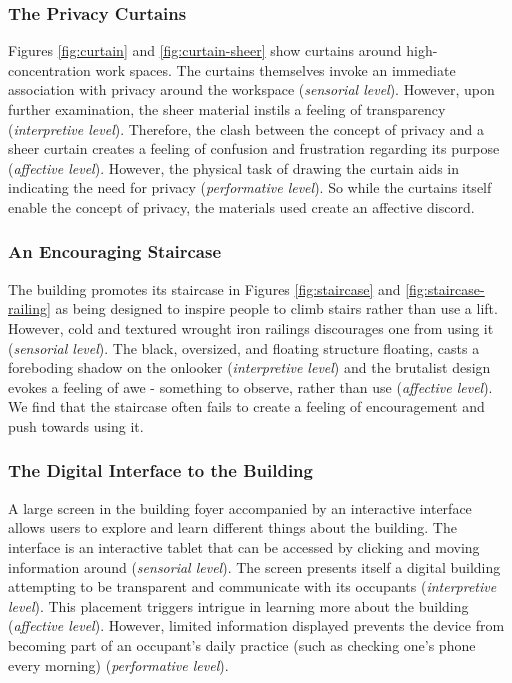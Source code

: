 \documentclass[manuscript, anonymous, review]{acmart}
\begin{document}
\subsubsection*{The Privacy Curtains}
Figures \ref{fig:curtain} and \ref{fig:curtain-sheer} show curtains around high-concentration work spaces. The curtains themselves invoke an immediate association with privacy around the workspace (\textit{sensorial level}). However, upon further examination, the sheer material instils a feeling of transparency (\textit{interpretive level}). Therefore, the clash between the concept of privacy and a sheer curtain creates a feeling of confusion and frustration regarding its purpose (\textit{affective level}). However, the physical task of drawing the curtain aids in indicating the need for privacy (\textit{performative level}). So while the curtains itself enable the concept of privacy, the materials used  create an affective discord. 

\subsubsection*{An Encouraging Staircase}
The building promotes its staircase in Figures \ref{fig:staircase} and \ref{fig:staircase-railing} as being designed to inspire people to climb stairs rather than use a lift. However, cold and textured wrought iron railings discourages one from using it (\textit{sensorial level}). The black, oversized, and floating structure floating, casts a foreboding  shadow on the onlooker  (\textit{interpretive level}) and the brutalist design evokes a feeling of awe - something to observe, rather than use (\textit{affective level}). We find that the staircase often fails to create a feeling of encouragement and push towards using it.

\subsubsection*{The Digital Interface to the Building}
A large screen in the building foyer accompanied by an interactive interface allows users to explore and learn different things about the building. The interface is an interactive tablet that can be accessed by clicking and moving information around (\textit{sensorial level}). The screen presents itself a digital building attempting to be transparent and communicate with its occupants (\textit{interpretive level}). This placement triggers intrigue in learning more about the building (\textit{affective level}). However, limited information displayed prevents the device from becoming part of an occupant's daily practice (such as checking one's phone every morning) (\textit{performative level}). 
\end{document}
